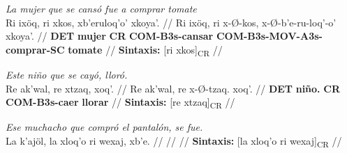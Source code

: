 \documentclass{article}%
\begin{document}
%
\par\medskip%
\ex
\textit{La mujer que se cansó fue a comprar tomate} \\
\begingl
\gla Ri ixöq, ri xkos, xb'eruloq'o' xkoya'. //
\glb Ri ixöq, ri x-Ø-kos, x-Ø-b'e-ru-loq'-o' xkoya'. //
\glc \textbf{DET} \textbf{mujer} \textbf{CR} \textbf{COM-}\textbf{B3s-}\textbf{cansar} \textbf{COM-}\textbf{B3s-}\textbf{MOV-}\textbf{A3s-}\textbf{comprar-}\textbf{SC} \textbf{tomate} //
\glft \textbf{Sintaxis:} [ri xkos]\textsubscript{CR} //
\endgl
\xe
%
\medskip%
\par\medskip%
\ex
\textit{Este niño que se cayó, lloró.} \\
\begingl
\gla Re ak'wal, re xtzaq, xoq'. //
\glb Re ak'wal, re x-Ø-tzaq. xoq'. //
\glc \textbf{DET} \textbf{niño.} \textbf{CR} \textbf{COM-}\textbf{B3s-}\textbf{caer} \textbf{llorar} //
\glft \textbf{Sintaxis:} [re xtzaq]\textsubscript{CR} //
\endgl
\xe
%
\medskip%
\par\medskip%
\ex
\textit{Ese muchacho que compró el pantalón, se fue.} \\
\begingl
\gla La k'ajöl, la xloq'o ri wexaj, xb'e. //
\glb  //
\glc  //
\glft \textbf{Sintaxis:} [la xloq'o ri wexaj]\textsubscript{CR} //
\endgl
\xe
%
\medskip

%
\end{document}
